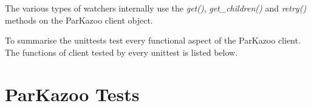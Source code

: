 The various types of watchers internally use the \textit{get()}, \textit{get\_children()} and \textit{retry()} methods on the ParKazoo client object.

To summarise the unittests test every functional aspect of the ParKazoo client. The functions of client tested by every unittest is listed below.



\section{ParKazoo Tests}
